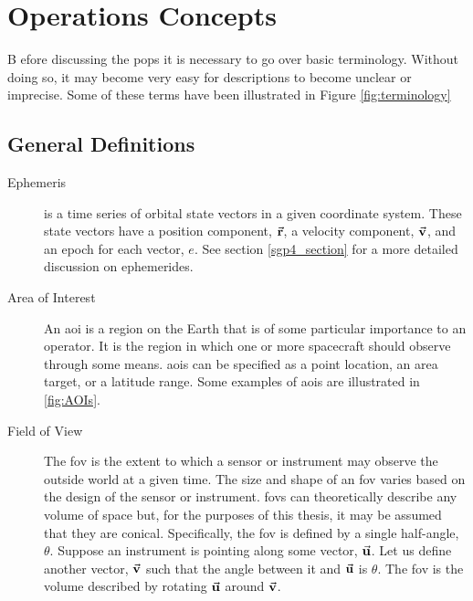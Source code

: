 \glsresetall{} 
\chapter{Operations Concepts}

\lettrine[lines=2, findent=0pt, nindent=5pt]{B}{} efore discussing the
\gls{pops} it is necessary to go over basic terminology. Without doing so, it
may become very easy for descriptions to become unclear or imprecise. Some of
these terms have been illustrated in Figure \ref{fig:terminology}

\section{General Definitions}

\begin{description} 

    \item[Ephemeris] is a time series of orbital state vectors in a given
	coordinate system. These state vectors have a position component,
	$\vec{\bm{\mathrm{r}}}$, a velocity component, $\vec{\bm{\mathrm{v}}}$, and an epoch for each
	vector, $e$. See section \ref{sgp4_section} for a more detailed
	discussion on ephemerides.

    \item[Area of Interest] An \gls{aoi} is a region on the Earth that is of
	some particular importance to an operator. It is the region in which
	one or more spacecraft should observe through some means. \glspl{aoi}
	can be specified as a point location, an area target, or a latitude
	range. Some examples of \glspl{aoi} are illustrated in \ref{fig:AOIs}.

    \item[Field of View] The \gls{fov} is the extent to which a sensor or
	instrument may observe the outside world at a given time. The size and
	shape of an \gls{fov} varies based on the design of the sensor or
	instrument. \glspl{fov} can theoretically describe any volume of space
	but, for the purposes of this thesis, it may be assumed that they are
	conical. Specifically, the \gls{fov} is defined by a single half-angle,
	$\theta$. Suppose an instrument is pointing along some vector,
	$\vec{\bm{\mathrm{u}}}$. Let us define another vector, $\vec{\bm{\mathrm{v}}}$ such that the angle
	between it and $\vec{\bm{\mathrm{u}}}$ is $\theta$. The \gls{fov} is the volume
	described by rotating $\vec{\bm{\mathrm{u}}}$ around $\vec{\bm{\mathrm{v}}}$.



\end{description}
